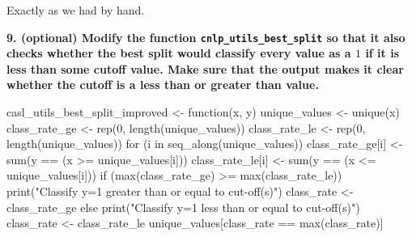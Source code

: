 \documentclass[12pt,hidelinks]{article}
\newcommand{\code}[1]{\texttt{#1}}
\numberwithin{equation}{section}
\begin{document}
Exactly as we had by hand.

\vspace*{12pt}

\textbf{9. (optional) Modify the function \code{cnlp\_utils\_best\_split} so that
it also checks whether the best split would classify every value as a $1$ if
it is less than some cutoff value. Make sure that the output makes it clear
whether the cutoff is a less than or greater than value.}

\vspace*{12pt}

\begin{rcode}
casl_utils_best_split_improved <-
function(x, y)
{
  unique_values <- unique(x)
  class_rate_ge <- rep(0, length(unique_values))
  class_rate_le <- rep(0, length(unique_values))
  for (i in seq_along(unique_values))
  {
    class_rate_ge[i] <- sum(y == (x >= unique_values[i]))
    class_rate_le[i] <- sum(y == (x <= unique_values[i]))
  }
  if (max(class_rate_ge) >= max(class_rate_le))
  {
    print("Classify y=1 greater than or equal to cut-off(s)")
    class_rate <- class_rate_ge
  } else {
    print("Classify y=1 less than or equal to cut-off(s)")
    class_rate <- class_rate_le
  }
  unique_values[class_rate == max(class_rate)]
}
\end{rcode}

\vspace*{12pt}
\end{document}
